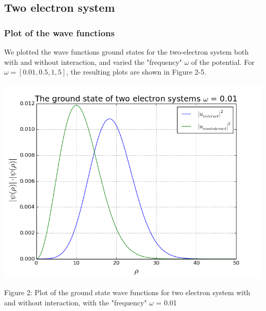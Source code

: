 \documentclass[norsk,a4paper,12pt]{article}
\begin{document}
\par
\vspace{5mm}

\subsection{Two electron system}
\par
\vspace{3mm}

\subsubsection{Plot of the wave functions}
\par
\vspace{3mm}

We plotted the wave functions ground states for the two-electron system both with and without interaction, and varied the "frequency" $\omega$ of the potential. For $\omega = [0.01, 0.5, 1, 5]$, the resulting plots are shown in Figure 2-5. 
\par
\vspace{3mm}

\includegraphics[scale=0.5]{wavefunc_two_omega=0_01}\par
\vspace{1mm}
Figure 2: Plot of the ground state wave functions for two electron system with and without interaction, with the "frequency" $\omega$ = 0.01
\par
\vspace{7mm}
\end{document}
